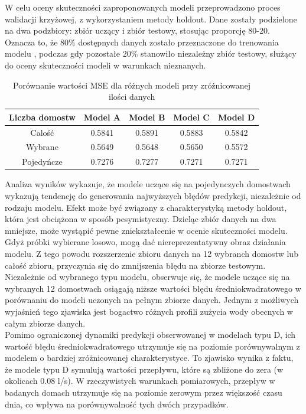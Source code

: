 \documentclass[a4paper,twoside,12pt]{book}
\begin{document}
W celu oceny skuteczności zaproponowanych modeli przeprowadzono proces walidacji krzyżowej, z wykorzystaniem metody holdout. Dane zostały podzielone na dwa podzbiory: zbiór uczący i zbiór testowy, stosując proporcję 80-20. Oznacza to, że 80\% dostępnych danych zostało przeznaczone do trenowania modelu , podczas gdy pozostałe 20\% stanowiło niezależny zbiór testowy, służący do oceny skuteczności modeli w warunkach nieznanych.
\begin{table}[!h]
  \centering
  \renewcommand{\arraystretch}{1.5}
  \caption{Porównanie wartości MSE dla różnych modeli przy zróżnicowanej ilości danych}
  \begin{tabular}{|c|c|c|c|c|}
    \hline
    Liczba domostw & Model A & Model B & Model C & Model D \\ \hline
    Calość         & 0.5841  & 0.5891  & 0.5883  & 0.5842  \\ \hline
    Wybrane        & 0.5649  & 0.5648  & 0.5650  & 0.5572  \\ \hline
    Pojedyńcze     & 0.7276  & 0.7277  & 0.7271  & 0.7271  \\ \hline
  \end{tabular}
\end{table}

Analiza wyników wykazuje, że modele uczące się na pojedynczych domostwach wykazują tendencję do generowania najwyższych błędów predykcji, niezależnie od rodzaju modelu. Efekt może być związany z charakterystyką metody holdout, która jest obciążona w sposób pesymistyczny. Dzieląc zbiór danych na dwa mniejsze,  może wystąpić pewne zniekształcenie w ocenie skuteczności modelu. Gdyż próbki wybierane losowo, mogą dać niereprezentatywny obraz działania modelu. Z tego powodu rozszerzenie zbioru danych na 12 wybranch domostw lub całość zbioru, przyczynia się do zmnijszenia błędu na zbiorze testowym.\\

Niezależnie od wybranego typu modelu, obserwuje się, że modele uczące się na wybranych 12 domostwach osiągają niższe wartości błędu średniokwadratowego w porównaniu do modeli uczonych na pełnym zbiorze danych. Jednym z możliwych wyjaśnień tego zjawiska jest bogactwo różnych profili zużycia wody obecnych w całym zbiorze danych.\\

Pomimo ograniczonej dynamiki predykcji obserwowanej w modelach typu D, ich wartość błędu średniokwadratowego utrzymuje się na poziomie porównywalnym z modelem o bardziej zróżnicowanej charakterystyce. To zjawisko wynika z faktu, że modele typu D symulują wartości przepływu, które są zbliżone do zera (w okolicach 0.08 l/s). W rzeczywistych warunkach pomiarowych, przepływ w badanych domach utrzymuje się na poziomie zerowym przez większość czasu dnia, co wpływa na porównywalność tych dwóch przypadków.\\
\end{document}
